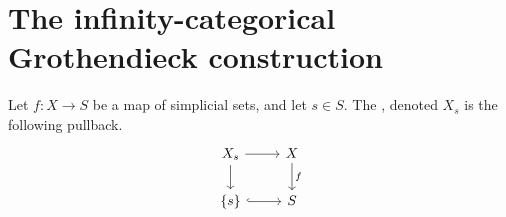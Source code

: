 \documentclass[main.tex]{subfiles}
\begin{document}
\section{The infinity-categorical Grothendieck construction}
\label{sec:the_infinity_categorical_grothendieck_construction}

\begin{definition}
  \label{def:fiber_over_a_point}
  Let $f\colon X \to S$ be a map of simplicial sets, and let $s \in S$. The , denoted $X_{s}$ is the following pullback.
  \begin{equation*}
    \begin{tikzcd}
      X_{s}
      \arrow[r]
      \arrow[d]
      & X
      \arrow[d, "f"]
      \\
      \{s\}
      \arrow[r, hookrightarrow]
      & S
    \end{tikzcd}
  \end{equation*}
\end{definition}
\end{document}
